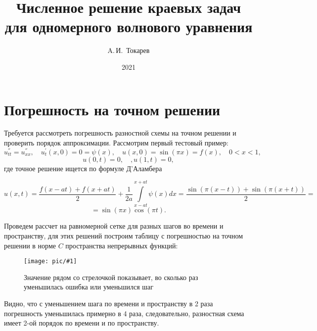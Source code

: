 \documentclass[12pt, a4paper]{article}
\title{Численное решение краевых задач для одномерного волнового уравнения}
\author{A.\,И.~Токарев}
\date{2021}
\newcommand{\Picture}[4]
{
\begin{figure}[H]
\noindent 
\centering\texttt{[image: pic/\#1]}
\caption{#3}
\label{#4}
\end{figure}
}
\begin{document}
\maketitle
\tableofcontents 
\newpage

\section{Погрешность на точном решении}

Требуется рассмотреть погрешность разностной схемы на точном решении и проверить порядок аппроксимации. Рассмотрим первый тестовый пример:
\[
u^{''}_{tt}=u^{''}_{xx},\quad u^{'}_t(x,0) = 0 = \psi(x), \quad u(x,0) = \sin (\pi x) = f(x),\quad 0<x<1,
\]
\[
u(0,t) = 0, \quad, u(1,t) = 0,
\]
где точное решение ищется по формуле Д'Аламбера

\[
u(x,t) =\dfrac{ f(x - at) + f(x + at)}{2} + \dfrac{1}{2a}\int\limits_{x-at}^{x+at}{\psi (x)dx} = \dfrac{\sin(\pi(x-t)) + \sin(\pi(x + t))}{2} =
\]
\[
= \sin(\pi x)\cos(\pi t).
\]

Проведем рассчет на равномерной сетке для разных шагов во времени и пространству, для этих решений построим таблицу с погрешностью на точном решении в норме $C$ пространства непрерывных функций:
\Picture{погр.png}{1}{Значение рядом со стрелочкой показывает, во сколько раз уменьшилась ошибка или уменьшился шаг}{}

Видно, что с уменьшением шага по времени и пространству в 2 раза погрешность уменьшилась примерно в 4 раза, следовательно, разностная схема имеет 2-ой порядок по времени и по пространству.


\newpage
\end{document}
